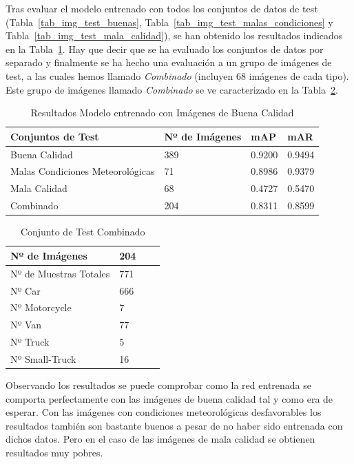 Tras evaluar el modelo entrenado con todos los conjuntos de datos de test (Tabla~\ref{tab_img_test_buenas}, Tabla~\ref{tab_img_test_malas_condiciones} y Tabla~\ref{tab_img_test_mala_calidad}),  se han obtenido los resultados indicados en la Tabla~\ref{resultados_test_buenas}. Hay que decir que se ha evaluado los conjuntos de datos por separado y finalmente se ha hecho una evaluación a un grupo de imágenes de test, a las cuales hemos llamado \textit{Combinado} (incluyen 68 imágenes de cada tipo). Este grupo de imágenes llamado \textit{Combinado} se ve caracterizado en la Tabla~\ref{test_combinado}.

\begin{table}[H] 
\begin{center}
\begin{tabular}{|l|l|l|l|}
\hline
 Conjuntos de Test & Nº de Imágenes & mAP & mAR  \\ 
\hline \hline
Buena Calidad & 389 & 0.9200 & 0.9494 \\ \hline
Malas Condiciones Meteorológicas & 71 & 0.8986 & 0.9379 \\ \hline
Mala Calidad  & 68 & 0.4727 & 0.5470\\ \hline
Combinado & 204 & 0.8311 & 0.8599\\ \hline
\end{tabular}
\caption{Resultados Modelo entrenado con Imágenes de Buena Calidad}
\label{resultados_test_buenas}
\end{center}
\end{table}

\begin{table}[H] 
\begin{center}
\begin{tabular}{|l|l|l|l|}
\hline
Nº de Imágenes  & 204 \\
\hline \hline
Nº de Muestras Totales & 771\\ \hline
Nº Car & 666 \\ \hline
Nº Motorcycle & 7 \\ \hline
Nº Van & 77 \\ \hline
Nº Truck & 5 \\ \hline
Nº Small-Truck & 16 \\ \hline
\end{tabular}
\caption{Conjunto de Test Combinado}
\label{test_combinado}
\end{center}
\end{table}

Observando los resultados se puede comprobar como la red entrenada se comporta perfectamente con las imágenes de buena calidad tal y como era de esperar. Con las imágenes con condiciones meteorológicas desfavorables los resultados también son bastante buenos a pesar de no haber sido entrenada con dichos datos.  Pero en el caso de las imágenes de mala calidad se obtienen resultados muy pobres.

